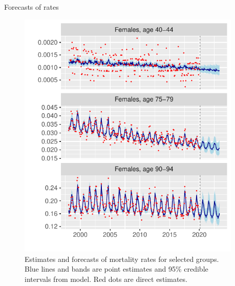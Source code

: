 \documentclass[final]{beamer}
\newlength{\onecolwid}
\newlength{\twocolwid}
\begin{document}
\begin{frame}[t]
\begin{columns}[t]
\begin{column}{\twocolwid}
\begin{columns}[t,totalwidth=\twocolwid]
\begin{column}{\onecolwid}
\begin{block}{Forecasts of rates}
\begin{figure}
\includegraphics[width = \linewidth]{fig_forecasted_rates}
\caption{Estimates and forecasts of mortality rates for selected groups. Blue lines and bands are point estimates and 95\% credible intervals from model. Red dots are direct estimates.}
\end{figure}
\end{block}

\end{column} %

\begin{column}{\onecolwid}\vspace{-.6in} %


\end{column}
\end{columns}
\end{column}
\end{columns}
\end{frame}
\end{document}
